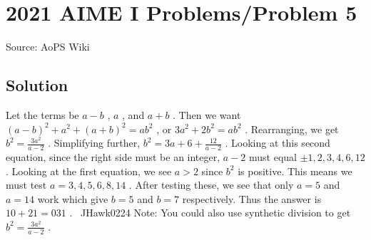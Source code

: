\documentclass[12pt]{article}
\begin{document}
\section*{{2021 AIME I Problems/Problem 5}}
Source: AoPS Wiki

\subsection*{Solution}
Let the terms be $a-b$ , $a$ , and $a+b$ . Then we want $(a-b)^2+a^2+(a+b)^2=ab^2$ , or $3a^2+2b^2=ab^2$ . Rearranging, we get $b^2=\frac{3a^2}{a-2}$ . Simplifying further, $b^2=3a+6+\frac{12}{a-2}$ . Looking at this second equation, since the right side must be an integer, $a-2$ must equal $\pm1, 2, 3, 4, 6, 12$ . Looking at the first equation, we see $a>2$ since $b^2$ is positive. This means we must test $a=3, 4, 5, 6, 8, 14$ . After testing these, we see that only $a=5$ and $a=14$ work which give $b=5$ and $b=7$ respectively. Thus the answer is $10+21=\boxed{031}$ .
~JHawk0224 Note: You could also use synthetic division to get $b^2=\frac{3a^2}{a-2}$ .
\end{document}
